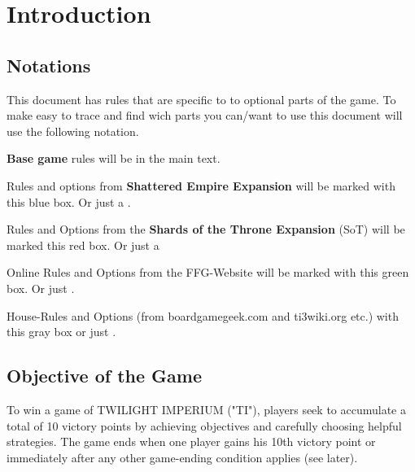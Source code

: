 \documentclass[11pt,fleqn]{book} %
\begin{document}
\tableofcontents %


\pagestyle{fancy} %


\chapter{Introduction}

\section{Notations}

This document has rules that are specific to to optional parts of the game. To make easy to trace and find wich parts you can/want to use this document will use the following notation.

\textbf{Base game} rules will be in the main text.

\begin{SEbox}
Rules and options from \textbf{Shattered Empire Expansion} will be marked with this blue box.
Or just a .
\end{SEbox}


\begin{STbox}
Rules and Options from the \textbf{Shards of the Throne Expansion} (SoT) will be marked this red box. 
Or just a 
\end{STbox}

\begin{FFGbox}
Online Rules and Options from the FFG-Website will be marked with this green box. 
Or just .
\end{FFGbox}

\begin{HRbox}
House-Rules and Options (from boardgamegeek.com and ti3wiki.org etc.) with this gray box or just .
\end{HRbox}


\section{Objective of the Game}
To win a game of TWILIGHT IMPERIUM ("TI"), players seek to accumulate a total of 10 victory points by achieving objectives and carefully choosing helpful strategies. The game ends when one player gains his 10th victory point or immediately after any other game-ending condition applies (see later).
\end{document}
